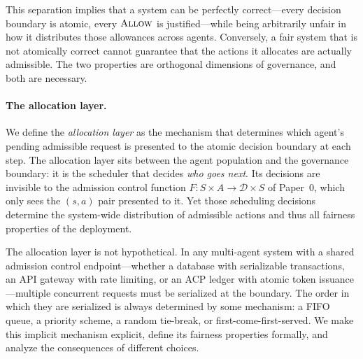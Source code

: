 \documentclass[11pt]{article}
\theoremstyle{plain}
\theoremstyle{definition}
\theoremstyle{remark}
\newcommand{\Allow}{\textsc{Allow}}
\newcommand{\Dset}{\mathcal{D}}
\begin{document}
This separation implies that a system can be perfectly correct---every
decision boundary is atomic, every $\Allow$ is justified---while
being arbitrarily unfair in how it distributes those allowances across
agents.  Conversely, a fair system that is not atomically correct cannot
guarantee that the actions it allocates are actually admissible.  The two
properties are orthogonal dimensions of governance, and both are
necessary.

\paragraph{The allocation layer.}
We define the \emph{allocation layer} as the mechanism that determines
which agent's pending admissible request is presented to the atomic
decision boundary at each step.  The allocation layer sits between the
agent population and the governance boundary: it is the scheduler that
decides \emph{who goes next}.  Its decisions are invisible to the
admission control function $F : S \times A \to \Dset \times S$ of
Paper~0, which only sees the $(s, a)$ pair presented to it.
Yet those scheduling decisions determine the system-wide distribution of
admissible actions and thus all fairness properties of the deployment.

The allocation layer is not hypothetical.  In any multi-agent system with
a shared admission control endpoint---whether a database with
serializable transactions, an API gateway with rate limiting, or an ACP
ledger with atomic token issuance---multiple concurrent requests must be
serialized at the boundary.  The order in which they are serialized is
always determined by some mechanism: a FIFO queue, a priority scheme, a
random tie-break, or first-come-first-served.  We make this implicit
mechanism explicit, define its fairness properties formally, and analyze
the consequences of different choices.
\end{document}
